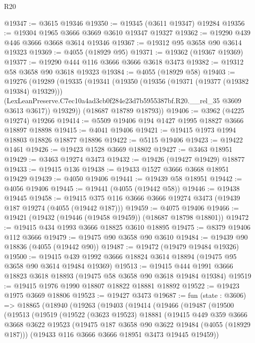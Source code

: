 \begin{lexlean}{R20}
\begin{coremodule}
@19347 := @3615 @19346
@19350 := @19345 (@3611 @19347) @19284
@19356 := @19304 @1965 @3666 @3669 @3610 @19347 @19327
@19362 := @19290 @439 @446 @3666 @3668 @3614 @19346
@19367 := @19312 @95 @3658 @90 @3614 @19323
@19369 := @4055 (@18929 @95)
@19371 := @19362 (@19367 @19369)
@19377 := @19290 @444 @116 @3666 @3666 @3618 @3473
@19382 := @19312 @58 @3658 @90 @3618 @19323
@19384 := @4055 (@18929 @58)
@19403 := @19276
    (@19289
      (@19335
        (@19341
          (@19350
            (@19356 (@19371 (@19377 (@19382 @19384) @19329)))
            (LexLeanPreserve.C7ec10a4ad3cb0f284e23d7b5955387bf.R20.__rel_35 @3609 @3613 @3617))
          @19329))
      (@18687 @18789 @18793))
@19406 := @3962 (@4225 @19274) @19266
@19414 := @5509 @19406 @194 @1427 @1995 @18827 @3666 @18897 @18898
@19415 := @4041 @19406
@19421 := @19415 @1973 @1994 @18803 @18826 @18877 @18896
@19422 := @5115 @19406
@19423 := @19422 @1461
@19426 := @19423 @1528 @3669 @18802
@19427 := @3463 @18951
@19429 := @3463 @19274 @3473
@19432 := @19426 (@19427 @19429) @18877
@19433 := @19415 @136
@19438 := @19433 @1527 @3666 @3668 @18951 @19429
@19439 := @4050 @19406
@19441 := @19439 @58 @18951
@19442 := @4056 @19406
@19445 := @19441 (@4055 (@19442 @58))
@19446 := @19438 @19445
@19458 := @19415 @375 @116 @3666 @3666 @19274 @3473 (@19439 @187 @19274 (@4055 (@19442 @187)))
@19459 := @4075 @19406
@19466 := @19421 (@19432 (@19446 (@19458 @19459)) (@18687 @18798 @18801))
@19472 := @19415 @434 @1993 @3666 @18825 @3610 @18895
@19475 := @8379 @19406 @112 @3666
@19479 := @19475 @90 @3658 @90 @3610
@19484 := @19439 @90 @18836 (@4055 (@19442 @90))
@19487 := @19472 (@19479 @19484 @19326)
@19500 := @19415 @439 @1992 @3666 @18824 @3614 @18894 (@19475 @95 @3658 @90 @3614 @19484 @19369)
@19513 := @19415 @444 @1991 @3666 @18823 @3618 @18893 (@19475 @58 @3658 @90 @3618 @19484 @19384)
@19519 := @19415 @1976 @1990 @18807 @18822 @18881 @18892
@19522 := @19423 @1975 @3669 @18806
@19523 := @19427 @3473
@19687 := fun (state : @3606) =>
  @18865
    (@18940
      (@19263
        (@19403
          (@19414
            (@19466
              (@19487
                (@19500
                  (@19513
                    (@19519
                      (@19522
                        (@3623 @19523)
                        @18881
                        (@19415
                          @449
                          @359
                          @3666
                          @3668
                          @3622
                          @19523
                          (@19475 @187 @3658 @90 @3622 @19484 (@4055 (@18929 @187)))
                          (@19433 @116 @3666 @3666 @18951 @3473 @19445 @19459))

\end{coremodule}
\end{lexlean}

